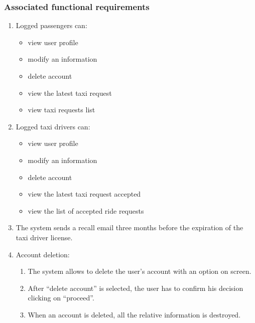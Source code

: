 \subsubsection{Associated functional requirements}
\begin{enumerate}

\item Logged passengers can:
\begin{itemize}
\item view user profile
\item modify an information
\item delete account
\item view the latest taxi request
\item view taxi requests list
\end{itemize}

\item Logged taxi drivers can:
\begin{itemize}
\item view user profile
\item modify an information
\item delete account
\item view the latest taxi request accepted
\item view the list of accepted ride requests
\end{itemize}

\item The system sends a recall email three months before the expiration of the taxi driver license.

\item Account deletion:
\begin{enumerate}
\item The system allows to delete the user's account with an option on screen.
\item After ``delete account'' is selected, the user has to confirm his decision clicking on ``proceed''.
\item When an account is deleted, all the relative information is destroyed.
\end{enumerate}


\end{enumerate}

